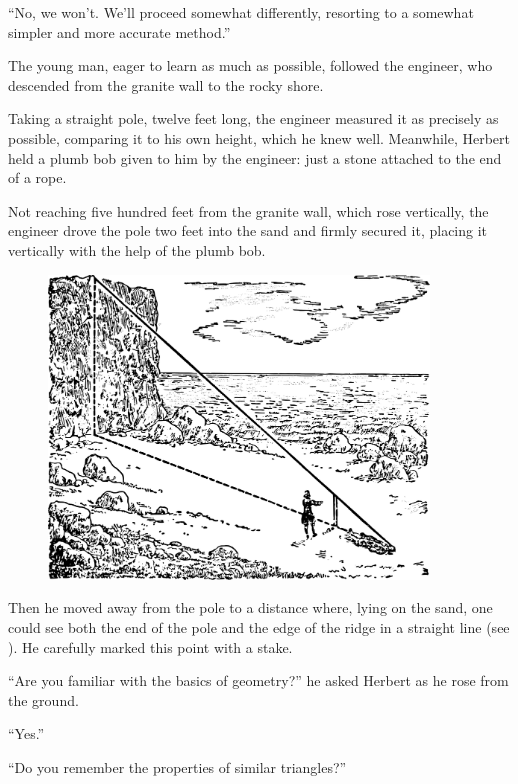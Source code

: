 ``No, we won't. We'll proceed somewhat differently, resorting to a somewhat simpler and more accurate method.''

The young man, eager to learn as much as possible, followed the engineer, who descended from the granite wall to the rocky shore.

Taking a straight pole, twelve feet long, the engineer measured it as precisely as possible, comparing it to his own height, which he knew well. Meanwhile, Herbert held a plumb bob given to him by the engineer: just a stone attached to the end of a rope.

Not reaching five hundred feet from the granite wall, which rose vertically, the engineer drove the pole two feet into the sand and firmly secured it, placing it vertically with the help of the plumb bob.

\begin{figure}[h!]
\centering
\includegraphics[width=0.9\textwidth]{figures/ch-01/fig-01-07.pdf}
\end{figure}

Then he moved away from the pole to a distance where, lying on the sand, one could see both the end of the pole and the edge of the ridge in a straight line (see ). He carefully marked this point with a stake.

``Are you familiar with the basics of geometry?'' he asked Herbert as he rose from the ground.

``Yes.''

``Do you remember the properties of similar triangles?''

